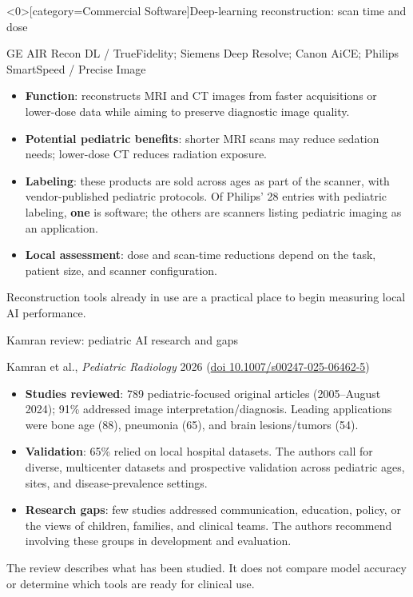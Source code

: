 \documentclass[aspectratio=169]{beamer}
\begin{document}
\begin{frame}<0>[category=Commercial Software]{Deep-learning reconstruction: scan time and dose}
\relax
{\scriptsize GE AIR Recon DL / TrueFidelity; Siemens Deep Resolve; Canon AiCE; Philips SmartSpeed / Precise Image\par}
\medskip
\small
\begin{itemize}
  \item \textbf{Function}: reconstructs MRI and CT images from faster acquisitions or lower-dose data while aiming to preserve diagnostic image quality.
  \item \textbf{Potential pediatric benefits}: shorter MRI scans may reduce sedation needs; lower-dose CT reduces radiation exposure.
  \item \textbf{Labeling}: these products are sold across ages as part of the scanner, with vendor-published pediatric protocols. Of Philips' 28 entries with pediatric labeling, \textbf{one} is software; the others are scanners listing pediatric imaging as an application.
  \item \textbf{Local assessment}: dose and scan-time reductions depend on the task, patient size, and scanner configuration.
\end{itemize}
\medskip
Reconstruction tools already in use are a practical place to begin measuring local AI performance.
\end{frame}

\begin{frame}[category=Reviews]{Kamran review: pediatric AI research and gaps}
\relax
{\scriptsize Kamran et al., \textit{Pediatric Radiology} 2026
(\href{https://doi.org/10.1007/s00247-025-06462-5}{doi 10.1007/s00247-025-06462-5})\par}
\medskip
\small
\begin{itemize}
  \item \textbf{Studies reviewed}: 789 pediatric-focused original articles (2005--August 2024); 91\% addressed image interpretation/diagnosis. Leading applications were bone age (88), pneumonia (65), and brain lesions/tumors (54).
  \item \textbf{Validation}: 65\% relied on local hospital datasets. The authors call for diverse, multicenter datasets and prospective validation across pediatric ages, sites, and disease-prevalence settings.
  \item \textbf{Research gaps}: few studies addressed communication, education, policy, or the views of children, families, and clinical teams. The authors recommend involving these groups in development and evaluation.
\end{itemize}
\medskip
The review describes what has been studied. It does not compare model accuracy or determine which tools are ready for clinical use.
\end{frame}
\end{document}
